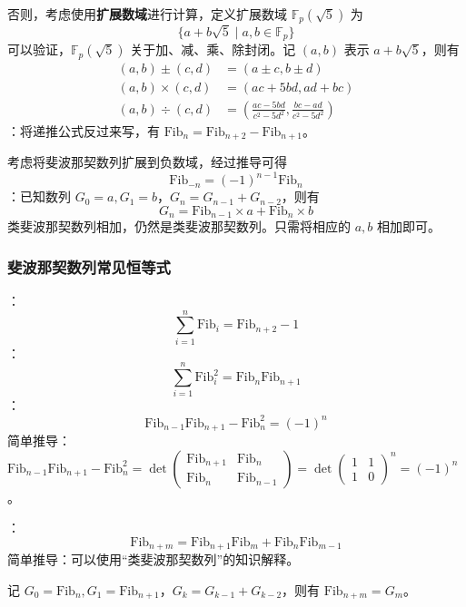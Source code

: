 否则，考虑使用\textbf{扩展数域}进行计算，定义扩展数域 $\mathbb{F}_p(\sqrt{5})$ 为
\[
\{ a + b\sqrt{5} \mid a, b \in \mathbb{F}_p \}
\]
可以验证，$\mathbb{F}_p(\sqrt{5})$ 关于加、减、乘、除封闭。记 $(a, b)$ 表示 $a + b\sqrt{5}$，则有
\[
\begin{aligned}
(a, b) \pm (c, d) & = (a\pm c, b\pm d) \\
(a, b) \times (c, d) & = (ac + 5bd, ad + bc) \\
(a, b) \div (c, d) & = \left( \frac{ac - 5bd}{c^2 - 5d^2} , \frac{bc - ad}{c^2 - 5d^2} \right)
\end{aligned}
\]
：将递推公式反过来写，有 $\mathrm{Fib}_n = \mathrm{Fib}_{n + 2} - \mathrm{Fib}_{n + 1}$。

考虑将斐波那契数列扩展到负数域，经过推导可得
\[
\mathrm{Fib}_{-n} = (-1)^{n - 1}\mathrm{Fib}_n
\]
：已知数列 $G_0 = a, G_1 = b$，$G_n = G_{n - 1} + G_{n - 2}$，则有
\[
G_n = \mathrm{Fib}_{n - 1} \times a + \mathrm{Fib}_n \times b
\]
类斐波那契数列相加，仍然是类斐波那契数列。只需将相应的 $a, b$ 相加即可。

\subsubsection{斐波那契数列常见恒等式}

：
\[
\sum_{i = 1}^n \mathrm{Fib}_i = \mathrm{Fib}_{n + 2} - 1
\]
：
\[
\sum_{i = 1}^n \mathrm{Fib}_i^2 = \mathrm{Fib}_n\mathrm{Fib}_{n + 1}
\]
：
\[
\mathrm{Fib}_{n - 1}\mathrm{Fib}_{n + 1} - \mathrm{Fib}_n^2 = (-1)^n
\]
简单推导：$\mathrm{Fib}_{n - 1}\mathrm{Fib}_{n + 1} - \mathrm{Fib}_n^2 = \det\begin{pmatrix} \mathrm{Fib}_{n + 1} & \mathrm{Fib}_n \\\mathrm{Fib}_n & \mathrm{Fib}_{n - 1} \end{pmatrix} = \det\begin{pmatrix} 1 & 1 \\1 & 0 \end{pmatrix}^n = (-1)^n$。

：
\[
\mathrm{Fib}_{n + m} = \mathrm{Fib}_{n + 1}\mathrm{Fib}_m + \mathrm{Fib}_n\mathrm{Fib}_{m - 1}
\]
简单推导：可以使用“类斐波那契数列”的知识解释。

记 $G_0 = \mathrm{Fib}_n, G_1 = \mathrm{Fib}_{n + 1}$，$G_k = G_{k - 1} + G_{k - 2}$，则有 $\mathrm{Fib}_{n + m} = G_m$。

